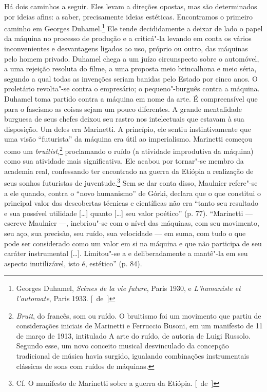 Há dois caminhos a seguir. Eles levam a direções opostas, mas são
determinados por ideias afins: a saber, precisamente ideias estéticas.
Encontramos o primeiro caminho em Georges Duhamel.\footnote{Georges
  Duhamel, \emph{Scènes de la vie future}, Paris 1930, e
  \emph{L'humaniste et l'automate}, Paris 1933. [~de~]} Ele tende
decididamente a deixar de lado o papel da máquina no processo de
produção e a criticá"-la levando em conta os vários inconvenientes e
desvantagens ligados ao uso, próprio ou outro, das máquinas pelo
homem privado. Duhamel chega a um juízo circunspecto sobre o automóvel,
a uma rejeição resoluta do filme, a uma proposta meio brincalhona e meio séria, segundo a qual todas as invenções seriam banidas pelo
Estado por cinco anos. O proletário revolta"-se contra o empresário; o
pequeno"-burguês contra a máquina. Duhamel toma partido contra a máquina
em nome da arte. É compreensível que para o fascismo as coisas sejam um
pouco diferentes. A grande mentalidade burguesa de seus chefes
deixou seu rastro nos intelectuais que estavam à sua disposição. Um
deles era Marinetti. A princípio, ele sentiu instintivamente que uma
visão ``futurista'' da máquina era útil ao imperialismo. Marinetti começou
como um \emph{bruitist},\footnote{\emph{Bruit}, do francês, som ou
  ruído. O bruitismo foi um movimento que partiu de considerações
  iniciais de Marinetti e Ferruccio Busoni, em um manifesto de 11 de
  março de 1913, intitulado A arte do ruído, de autoria de Luigi
  Russolo. Segundo esse, um novo conceito musical desvinculado da
  concepção tradicional de música havia surgido, igualando combinações
  instrumentais clássicas de sons com ruídos de máquinas. \versal{[N.~O.]}} proclamando
o ruído (a atividade improdutiva da máquina) como sua atividade mais
significativa. Ele acabou por tornar"-se membro da academia real,
confessando ter encontrado na guerra da Etiópia a realização de seus
sonhos futuristas de juventude.\footnote{Cf. O manifesto de
  Marinetti sobre a guerra da Etiópia. [~de~]} Sem se dar conta disso,
Maulnier refere"-se a ele quando, contra o ``novo humanismo'' de Górki,
declara que o que constitui o principal valor das descobertas técnicas e
científicas não era ``tanto seu resultado e sua possível utilidade
{[}\ldots{}{]} quanto {[}\ldots{}{]} seu valor poético'' (p. 77). ``Marinetti ---
escreve Maulnier ---, inebriou"-se com o nível das máquinas, com seu
movimento, seu aço, sua precisão, seu ruído, sua velocidade --- em suma,
com tudo o que pode ser considerado como um valor em si na máquina e que
não participa de seu caráter instrumental {[}\ldots{}{]}. Limitou"-se a e
deliberadamente a mantê"-la em seu aspecto inutilizável, isto é, estético''
(p. 84).

